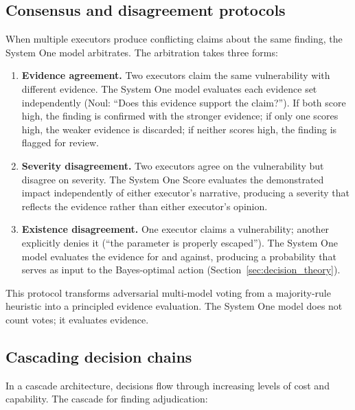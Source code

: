 \documentclass[conference]{IEEEtran}
\begin{document}
\subsection{Consensus and disagreement protocols}

When multiple executors produce conflicting claims about the same finding, the System One model arbitrates. The arbitration takes three forms:

\begin{enumerate}[leftmargin=*]
\item \textbf{Evidence agreement.} Two executors claim the same vulnerability with different evidence. The System One model evaluates each evidence set independently (Noul: ``Does this evidence support the claim?''). If both score high, the finding is confirmed with the stronger evidence; if only one scores high, the weaker evidence is discarded; if neither scores high, the finding is flagged for review.

\item \textbf{Severity disagreement.} Two executors agree on the vulnerability but disagree on severity. The System One Score evaluates the demonstrated impact independently of either executor's narrative, producing a severity that reflects the evidence rather than either executor's opinion.

\item \textbf{Existence disagreement.} One executor claims a vulnerability; another explicitly denies it (``the parameter is properly escaped''). The System One model evaluates the evidence for and against, producing a probability that serves as input to the Bayes-optimal action (Section~\ref{sec:decision_theory}).
\end{enumerate}

This protocol transforms adversarial multi-model voting from a majority-rule heuristic into a principled evidence evaluation. The System One model does not count votes; it evaluates evidence.

\subsection{Cascading decision chains}

In a cascade architecture, decisions flow through increasing levels of cost and capability. The cascade for finding adjudication:
\end{document}
